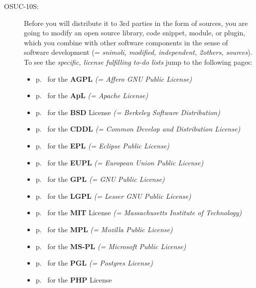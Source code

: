 \begin{description}
\item[OSUC-10S:]\label{OSUC-10S-DEF} Before you will distribute it to 3rd parties
in the form of sources, you are going to modify an open source library, code
snippet, module, or plugin, which you combine with other software components in
the sense of software development (= \textit{snimoli, modified, independent,
2others, sources}). To see the \textit{specific, license fulfilling to-do lists}
jump to the following pages:
  \begin{itemize}
    \item p.\ \pageref{OSUC-10S-AGPL} for the \textbf{AGPL}
      \textit{(= Affero GNU Public License)} 
    \item p.\ \pageref{OSUC-10S-Apache20} for the \textbf{ApL}
      \textit{(= Apache License)}
    \item p.\ \pageref{OSUC-10S-BSD} for the \textbf{BSD} License
      \textit{(= Berkeley Software Distribution)}
    \item p.\ \pageref{OSUC-10S-CDDL} for the \textbf{CDDL}
      \textit{(= Common Develop and Distribution License)}  
    \item p.\ \pageref{OSUC-10S-EPL} for the \textbf{EPL}
      \textit{(= Eclipse Public License)}     
    \item p.\ \pageref{OSUC-10S-EUPL} for the \textbf{EUPL}
      \textit{(= European Union Public License)} 
    \item p.\ \pageref{OSUC-10S-GPL} for the \textbf{GPL}
       \textit{(= GNU Public License)} 
    \item p.\ \pageref{OSUC-10S-LGPL} for the \textbf{LGPL}
      \textit{(= Lesser GNU Public License)}           
    \item p.\ \pageref{OSUC-10S-MIT} for the \textbf{MIT} License
       \textit{(= Massachusetts Institute of Technology)} 
    \item p.\ \pageref{OSUC-10S-MPL} for the \textbf{MPL}
      \textit{(= Mozilla Public License)}     
    \item p.\ \pageref{OSUC-10S-MS-PL} for the \textbf{MS-PL}
      \textit{(= Microsoft Public License)} 
    \item p.\ \pageref{OSUC-10S-PGL} for the \textbf{PGL}
      \textit{(= Postgres License)} 
    \item p.\ \pageref{OSUC-10S-PHP} for the \textbf{PHP} License 
  \end{itemize}


\end{description}
